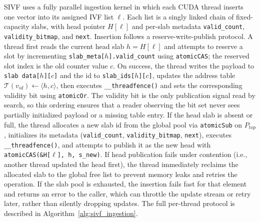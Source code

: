 \documentclass[sigconf,nonacm]{acmart}
\theoremstyle{plain}
\theoremstyle{definition}
\theoremstyle{remark}
\begin{document}
SIVF uses a fully parallel ingestion kernel in which each CUDA thread inserts one vector into its assigned IVF list $\ell$.
Each list is a singly linked chain of fixed-capacity slabs, with head pointer $H[\ell]$ and per-slab metadata
\texttt{valid\_count}, \texttt{validity\_bitmap}, and \texttt{next}. Insertion follows a reserve-write-publish protocol.
A thread first reads the current head slab $h=H[\ell]$ and attempts to reserve a slot by incrementing
\texttt{slab\_meta[$h$].valid\_count} using \texttt{atomicCAS}; the reserved slot index is the old counter value $c$.
On success, the thread writes the payload to \texttt{slab data[$h$][$c$]} and the id to \texttt{slab\_ids[$h$][$c$]}, updates
the address table $\mathcal{T}(v_{id})\gets\langle h,c\rangle$, then executes \verb|__threadfence()| and sets the corresponding
validity bit using \texttt{atomicOr}. The validity bit is the only publication signal read by search, so this ordering ensures
that a reader observing the bit set never sees partially initialized payload or a missing table entry. 
If the head slab is
absent or full, the thread allocates a new slab id from the global pool via \texttt{atomicSub} on $P_{top}$, initializes its
metadata (\texttt{valid\_count}, \texttt{validity\_bitmap}, \texttt{next}), executes \verb|__threadfence()|, and attempts to
publish it as the new head with \texttt{atomicCAS(\&H[$\ell$], h, s\_new)}. 
If head publication fails under contention (i.e., another thread updated the head first), the thread immediately reclaims the allocated slab to the global free list to prevent memory leaks and retries the operation.
If the slab pool is exhausted, the insertion fails fast for that element and returns an error to the caller, which can throttle the update stream or retry later, rather than silently dropping updates.
The full per-thread protocol is described in Algorithm~\ref{alg:sivf_ingestion}.
\end{document}

